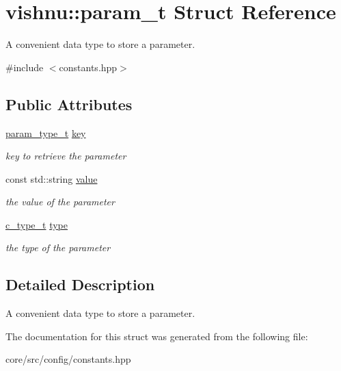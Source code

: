\hypertarget{structvishnu_1_1param__t}{
\section{vishnu::param\_\-t Struct Reference}
\label{structvishnu_1_1param__t}
}


A convenient data type to store a parameter.  




{\ttfamily \#include $<$constants.hpp$>$}

\subsection*{Public Attributes}
\begin{DoxyCompactItemize}
\item 
\hypertarget{structvishnu_1_1param__t_aa5ddc5895c65c3e15565c237767fe854}{
\hyperlink{namespacevishnu_afa06c1bb0b3442d83acb7650e8df75d1}{param\_\-type\_\-t} \hyperlink{structvishnu_1_1param__t_aa5ddc5895c65c3e15565c237767fe854}{key}}
\label{structvishnu_1_1param__t_aa5ddc5895c65c3e15565c237767fe854}

\begin{DoxyCompactList}\small\item\em key to retrieve the parameter \item\end{DoxyCompactList}\item 
\hypertarget{structvishnu_1_1param__t_a0e0ab5147d45a0534874278b4b0d0b61}{
const std::string \hyperlink{structvishnu_1_1param__t_a0e0ab5147d45a0534874278b4b0d0b61}{value}}
\label{structvishnu_1_1param__t_a0e0ab5147d45a0534874278b4b0d0b61}

\begin{DoxyCompactList}\small\item\em the value of the parameter \item\end{DoxyCompactList}\item 
\hypertarget{structvishnu_1_1param__t_aea92abf3252828b48153b811a9396b2b}{
\hyperlink{namespacevishnu_ad8abe82f8ea57792411b26b9ed15287e}{c\_\-type\_\-t} \hyperlink{structvishnu_1_1param__t_aea92abf3252828b48153b811a9396b2b}{type}}
\label{structvishnu_1_1param__t_aea92abf3252828b48153b811a9396b2b}

\begin{DoxyCompactList}\small\item\em the type of the parameter \item\end{DoxyCompactList}\end{DoxyCompactItemize}


\subsection{Detailed Description}
A convenient data type to store a parameter. 

The documentation for this struct was generated from the following file:\begin{DoxyCompactItemize}
\item 
core/src/config/constants.hpp\end{DoxyCompactItemize}
